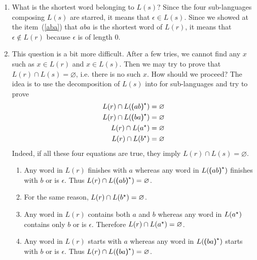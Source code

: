 \begin{enumerate}
    \item What is the shortest word belonging to \(L(s)\)?
      Since the four sub-languages composing \(L(s)\) are starred, it
      means that \(\epsilon \in L(s)\). Since we showed at the
      item~(\ref{aba}) that \(aba\) is the shortest word of \(L(r)\),
      it means that \(\epsilon \not\in L(r)\) because \(\epsilon\) is
      of length \(0\).

    \item This question is a bit more difficult. After a few
      tries, we cannot find any \(x\) such as \(x \in L(r)\) and \(x
      \in L(s)\). Then we may try to prove that \(L(r) \cap L(s) =
      \varnothing\), i.e. there is no such \(x\). How should we
      proceed? The idea is to use the decomposition of \(L(s)\) into
      for sub-languages and try to prove
      \begin{align*}
        L(r) \cap L(\textsf{(} ab \textsf{)}^{\star}) &= \varnothing\\
        L(r) \cap L(\textsf{(} ba \textsf{)}^{\star}) &= \varnothing\\
        L(r) \cap L(a^{\star}) &= \varnothing\\
        L(r) \cap L(b^{\star}) &= \varnothing
      \end{align*}
      Indeed, if all these four equations are true, they imply
        \(L(r) \cap L(s) = \varnothing\).
      \begin{enumerate}

        \item Any word in \(L(r)\) finishes with \(a\) whereas any
          word in \(L(\textsf{(} ab \textsf{)}^{\star})\) finishes with
          \(b\) or is \(\epsilon\). Thus \(L(r) \cap L(\textsf{(} ab
          \textsf{)}^{\star}) = \varnothing\).

        \item For the same reason, \(L(r) \cap L(b^{\star}) =
          \varnothing\).

        \item Any word in \(L(r)\) contains both \(a\) and \(b\)
          whereas any word in \(L(a^{\star})\) contains only \(b\) or
          is \(\epsilon\). Therefore \(L(r) \cap L(a^{\star}) =
          \varnothing\).

        \item Any word in \(L(r)\) starts with \(a\) whereas any
          word in \(L(\textsf{(} ba \textsf{)}^{\star})\) starts with
          \(b\) or is \(\epsilon\). Thus \(L(r) \cap L(\textsf{(} ba
          \textsf{)}^{\star}) = \varnothing\).


\end{enumerate}
\end{enumerate}
